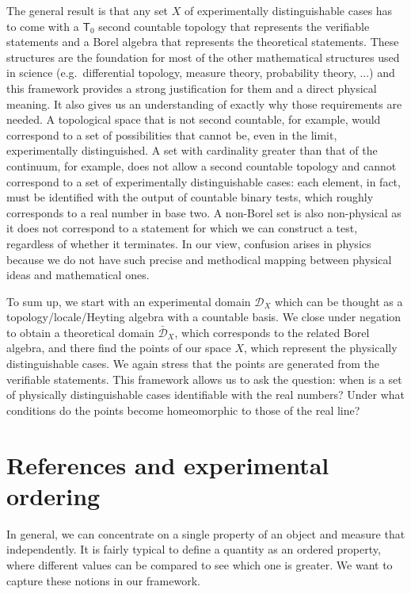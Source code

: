 \documentclass[submission,copyright,creativecommons]{eptcs}
\newcommand{\edomain}[1][D] {\mathcal{#1}} %
\newcommand{\tdomain}[1][D] {\bar{\mathcal{#1}}} %
\begin{document}
The general result is that any set $X$ of experimentally distinguishable cases has to come with a $\mathsf{T}_0$ second countable topology that represents the verifiable statements and a Borel algebra that represents the theoretical statements. These structures are the foundation for most of the other mathematical structures used in science (e.g.~differential topology, measure theory, probability theory, ...) and this framework provides a strong justification for them and a direct physical meaning. It also gives us an understanding of exactly why those requirements are needed. A topological space that is not second countable, for example, would correspond to a set of possibilities that cannot be, even in the limit, experimentally distinguished. A set with cardinality greater than that of the continuum, for example, does not allow a second countable topology and cannot correspond to a set of experimentally distinguishable cases: each element, in fact, must be identified with the output of countable binary tests, which roughly corresponds to a real number in base two. A non-Borel set is also non-physical as it does not correspond to a statement for which we can construct a test, regardless of whether it terminates. In our view, confusion arises in physics because we do not have such precise and methodical mapping between physical ideas and mathematical ones.

To sum up, we start with an experimental domain $\edomain_X$ which can be thought as a topology/locale/Heyting algebra with a countable basis. We close under negation to obtain a theoretical domain $\tdomain_X$, which corresponds to the related Borel algebra, and there find the points of our space $X$, which represent the physically distinguishable cases. We again stress that the points are generated from the verifiable statements. This framework allows us to ask the question: when is a set of physically distinguishable cases identifiable with the real numbers? Under what conditions do the points become homeomorphic to those of the real line?

\section{References and experimental ordering}

In general, we can concentrate on a single property of an object and measure that independently. It is fairly typical to define a quantity as an ordered property, where different values can be compared to see which one is greater. We want to capture these notions in our framework.
\end{document}
